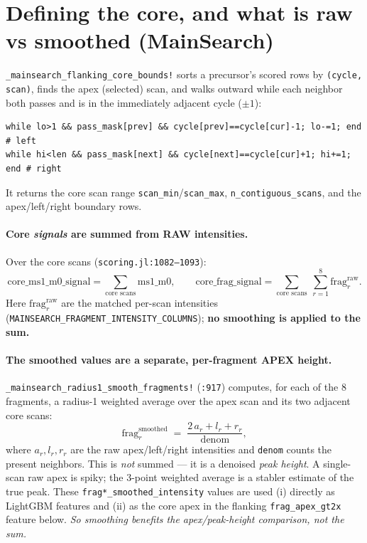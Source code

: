 \documentclass[11pt]{article}
\newcommand{\code}[1]{\texttt{#1}}
\begin{document}
\section{Defining the core, and what is raw vs smoothed (MainSearch)}
\code{\_mainsearch\_flanking\_core\_bounds!} sorts a precursor's scored rows by
\code{(cycle, scan)}, finds the apex (selected) scan, and walks outward while each neighbor
both passes and is in the immediately adjacent cycle ($\pm 1$):
\begin{lstlisting}
while lo>1 && pass_mask[prev] && cycle[prev]==cycle[cur]-1; lo-=1; end   # left
while hi<len && pass_mask[next] && cycle[next]==cycle[cur]+1; hi+=1; end # right
\end{lstlisting}
It returns the core scan range \code{scan\_min}/\code{scan\_max}, \code{n\_contiguous\_scans},
and the apex/left/right boundary rows.

\paragraph{Core \emph{signals} are summed from RAW intensities.} Over the core scans
(\code{scoring.jl:1082--1093}):
\[
\text{core\_ms1\_m0\_signal} = \!\!\sum_{\text{core scans}}\!\! \text{ms1\_m0}, \qquad
\text{core\_frag\_signal} = \!\!\sum_{\text{core scans}}\ \sum_{r=1}^{8} \text{frag}_r^{\text{raw}} .
\]
Here $\text{frag}_r^{\text{raw}}$ are the matched per-scan intensities
(\code{MAINSEARCH\_FRAGMENT\_INTENSITY\_COLUMNS}); \textbf{no smoothing is applied to the sum.}

\paragraph{The smoothed values are a separate, per-fragment APEX height.}
\code{\_mainsearch\_radius1\_smooth\_fragments!} (\code{:917}) computes, for each of the 8
fragments, a radius-1 weighted average over the apex scan and its two adjacent core scans:
\[
\text{frag}_r^{\text{smoothed}} \;=\; \frac{2\,a_r + l_r + r_r}{\text{denom}},
\]
where $a_r,l_r,r_r$ are the raw apex/left/right intensities and \code{denom} counts the
present neighbors. This is \emph{not} summed --- it is a denoised \emph{peak height}. A
single-scan raw apex is spiky; the 3-point weighted average is a stabler estimate of the true
peak. These \code{frag*\_smoothed\_intensity} values are used (i) directly as LightGBM
features and (ii) as the core apex in the flanking \code{frag\_apex\_gt2x} feature below.
\emph{So smoothing benefits the apex/peak-height comparison, not the sum.}
\end{document}
